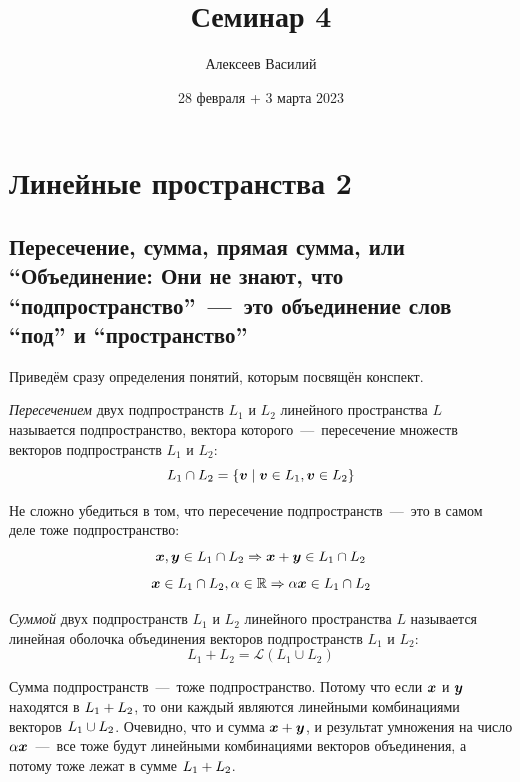 \documentclass[a4paper,12pt]{article}
\author{Алексеев Василий}
\title{Семинар 4}
\date{28 февраля + 3 марта 2023}
\begin{document}
  \maketitle
  
  \tableofcontents

  \thispagestyle{empty}
  
  \newpage
  


  \section{Линейные пространства 2}
  
  \subsection{Пересечение, сумма, прямая сумма, или ``Объединение: Они не знают, что ``подпространство''~---~это объединение слов ``под'' и ``пространство''}
  
  Приведём сразу определения понятий, которым посвящён конспект.
  
  \begin{definition}
    \emph{Пересечением} двух подпространств $L_1$ и $L_2$ линейного пространства $L$ называется подпространство, вектора которого~---~пересечение множеств векторов подпространств $L_1$ и $L_2$:
    \[
      L_1 \cap L_2 = \{\boldsymbol v \mid \boldsymbol v \in L_1, \boldsymbol v \in L_2\}
    \]
  \end{definition}
  
  Не сложно убедиться в том, что пересечение подпространств~---~это в самом деле тоже подпространство:
  \[
    \boldsymbol x, \boldsymbol y \in L_1 \cap L_2 \Rightarrow \boldsymbol x + \boldsymbol y \in L_1 \cap L_2
  \]
  \[
    \boldsymbol x \in L_1 \cap L_2, \alpha \in \operatorname{\mathbb R} \Rightarrow \alpha \boldsymbol x \in L_1 \cap L_2
  \]
  
  \begin{definition}[Сумма]
    \emph{Суммой} двух подпространств $L_1$ и $L_2$ линейного пространства $L$ называется линейная оболочка объединения векторов подпространств $L_1$ и $L_2$:
    \[
      L_1 + L_2 = \mathcal L(L_1 \cup L_2)
    \]
  \end{definition}
  
  Сумма подпространств~---~тоже подпространство.
  Потому что если $\boldsymbol x$ и $\boldsymbol y$ находятся в $L_1 \hm+ L_2$, то они каждый являются линейными комбинациями векторов $L_1 \hm\cup L_2$.
  Очевидно, что и сумма $\bds x \hm+ \bds y$, и результат умножения на число $\alpha \boldsymbol x$~---~все тоже будут линейными комбинациями векторов объединения, а потому тоже лежат в сумме $L_1 \hm+ L_2$.
  
\end{document}
